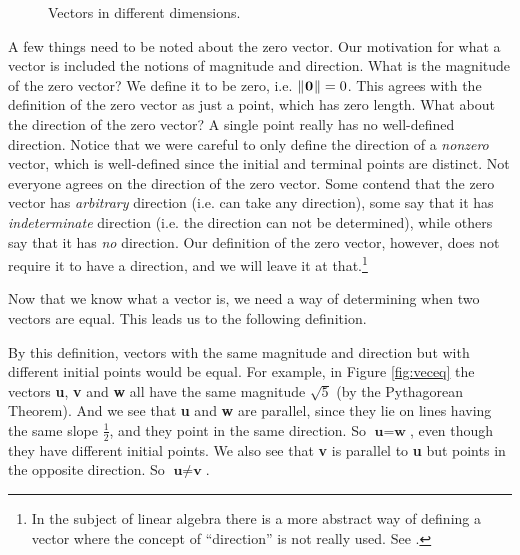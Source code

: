 \begin{figure}[h]
 \centering
 \qquad
 \qquad
 \caption[]{\quad Vectors in different dimensions.}
 \label{fig:vecs}
\end{figure}

A few things need to be noted about the zero vector.
Our motivation for what a vector is included the notions of
magnitude and direction. What is the magnitude of the zero vector? We define it to be zero, i.e.
$\lVert\mspace{1mu}\textbf{0}\mspace{1mu}\rVert = 0$.
This agrees with the definition of the zero vector as just a point, which has zero length.  What about the
direction of the zero vector?  A single point really has no well-defined direction.  Notice that we were careful
to only define the direction of a \emph{nonzero} vector, which is well-defined since the initial and
terminal points are distinct.
Not everyone agrees on the direction of the zero vector.  Some contend that the zero vector has \emph{arbitrary}
direction (i.e. can take any direction), some say that it has \emph{indeterminate} direction (i.e. the direction can
not be determined), while others say that it has \emph{no} direction. Our definition of the zero vector, however,
does not require it to have a direction, and we will leave it at that.\footnote{In the subject of linear algebra
there is a more abstract way of defining a vector where the concept of ``direction'' is not really used.
See \cite{ar}.}

Now that we know what a vector is, we need a way of determining when two vectors are equal.  This leads us to the
following definition.

By this definition, vectors with the same magnitude and direction but with different initial points would be
equal. For example, in Figure \ref{fig:veceq} the vectors \textbf{u}, \textbf{v} and \textbf{w} all have the same
magnitude $\sqrt 5$ (by the Pythagorean Theorem).  And we see that \textbf{u} and \textbf{w} are parallel, since they
lie on lines having the same slope $\frac{1}{2}$, and they point in the same direction. So $\textbf{u} = \textbf{w}$,
even though they have different initial points.  We also see that \textbf{v} is parallel to \textbf{u} but points in the
opposite direction. So $\textbf{u} \ne \textbf{v}$.

